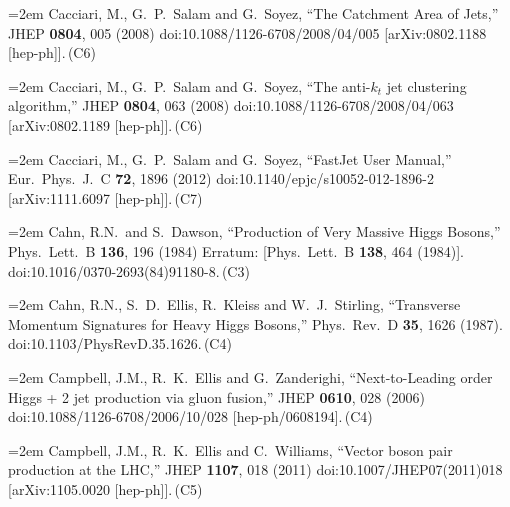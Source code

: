 \documentclass[letter,12pt]{article}
\def\xbibitem#1#2#3{\noindent\hangindent=2em #2\,(#3)}
\begin{document}
\xbibitem{Cacciari:2008gn}{Cacciari, M., G.~P.~Salam and G.~Soyez,
  ``The Catchment Area of Jets,''
  JHEP {\bf 0804}, 005 (2008)
  doi:10.1088/1126-6708/2008/04/005
  [arXiv:0802.1188 [hep-ph]].}{C6}
  
\xbibitem{Cacciari:2008gp}{Cacciari, M., G.~P.~Salam and G.~Soyez,
  ``The anti-$k_t$ jet clustering algorithm,''
  JHEP {\bf 0804}, 063 (2008)
  doi:10.1088/1126-6708/2008/04/063
  [arXiv:0802.1189 [hep-ph]].}{C6}

\xbibitem{Cacciari:2011ma}{Cacciari, M., G.~P.~Salam and G.~Soyez,
  ``FastJet User Manual,''
  Eur.\ Phys.\ J.\ C {\bf 72}, 1896 (2012)
  doi:10.1140/epjc/s10052-012-1896-2
  [arXiv:1111.6097 [hep-ph]].}{C7}

\xbibitem{Cahn:1983ip}{Cahn, R.N.\ and S.~Dawson,
  ``Production of Very Massive Higgs Bosons,''
  Phys.\ Lett.\ B {\bf 136}, 196 (1984)
  Erratum: [Phys.\ Lett.\ B {\bf 138}, 464 (1984)].
  doi:10.1016/0370-2693(84)91180-8.}{C3}

\xbibitem{Cahn:1986zv}{Cahn, R.N., S.~D.~Ellis, R.~Kleiss and W.~J.~Stirling,
  ``Transverse Momentum Signatures for Heavy Higgs Bosons,''
  Phys.\ Rev.\ D {\bf 35}, 1626 (1987).
  doi:10.1103/PhysRevD.35.1626.}{C4}
  
\xbibitem{Campbell:2006xx}{Campbell, J.M., R.~K.~Ellis and G.~Zanderighi,
  ``Next-to-Leading order Higgs + 2 jet production via gluon fusion,''
  JHEP {\bf 0610}, 028 (2006)
  doi:10.1088/1126-6708/2006/10/028
  [hep-ph/0608194].}{C4}

\xbibitem{Campbell:2011bn}{Campbell, J.M., R.~K.~Ellis and C.~Williams,
  ``Vector boson pair production at the LHC,''
  JHEP {\bf 1107}, 018 (2011)
  doi:10.1007/JHEP07(2011)018
  [arXiv:1105.0020 [hep-ph]].}{C5}
\end{document}
